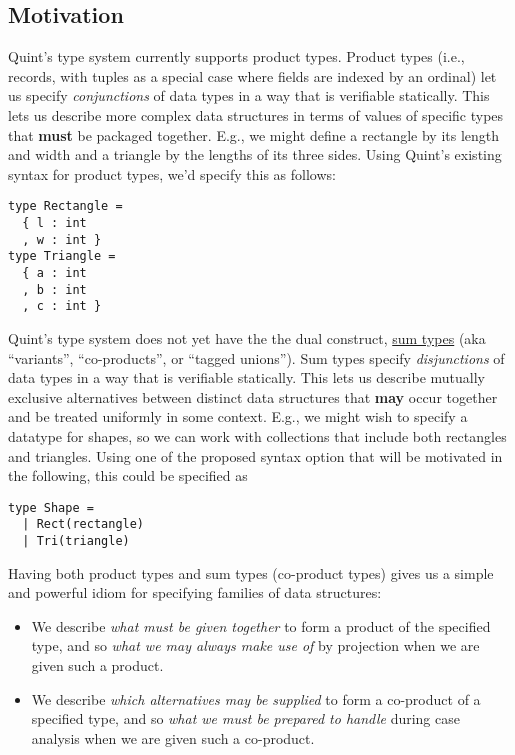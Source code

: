 \documentclass[11pt]{article}
\begin{document}
\subsection{Motivation}
\label{sec:org2103e46}
Quint's type system currently supports product types. Product types
(i.e., records, with tuples as a special case where fields are indexed
by an ordinal) let us specify \emph{conjunctions} of data types in a way that
is verifiable statically. This lets us describe more complex data
structures in terms of values of specific types that \textbf{must} be packaged
together. E.g., we might define a rectangle by its length and width and
a triangle by the lengths of its three sides. Using Quint's existing
syntax for product types, we'd specify this as follows:

\begin{verbatim}
type Rectangle = 
  { l : int
  , w : int }
type Triangle = 
  { a : int
  , b : int
  , c : int }
\end{verbatim}

Quint's type system does not yet have the the dual construct,
\href{https://en.wikipedia.org/wiki/Tagged\_union}{sum types} (aka
``variants'', ``co-products'', or ``tagged unions''). Sum types specify
\emph{disjunctions} of data types in a way that is verifiable statically.
This lets us describe mutually exclusive alternatives between distinct
data structures that \textbf{may} occur together and be treated uniformly in
some context. E.g., we might wish to specify a datatype for shapes, so
we can work with collections that include both rectangles and triangles.
Using one of the proposed syntax option that will be motivated in the
following, this could be specified as

\begin{verbatim}
type Shape =
  | Rect(rectangle)
  | Tri(triangle)
\end{verbatim}

Having both product types and sum types (co-product types) gives us a
simple and powerful idiom for specifying families of data structures:

\begin{itemize}
\item We describe \emph{what must be given together} to form a product of the
specified type, and so \emph{what we may always make use of} by projection
when we are given such a product.
\item We describe \emph{which alternatives may be supplied} to form a co-product
of a specified type, and so \emph{what we must be prepared to handle}
during case analysis when we are given such a co-product.
\end{itemize}
\end{document}
